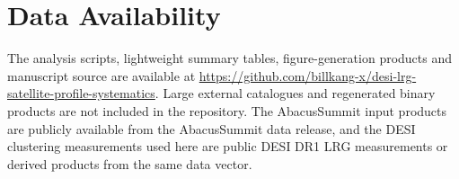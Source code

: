 \documentclass[fleqn,usenatbib]{mnras}
\begin{document}
\section*{Data Availability}

The analysis scripts, lightweight summary tables, figure-generation products and manuscript source are available at \url{https://github.com/billkang-x/desi-lrg-satellite-profile-systematics}.  Large external catalogues and regenerated binary products are not included in the repository.  The AbacusSummit input products are publicly available from the AbacusSummit data release, and the DESI clustering measurements used here are public DESI DR1 LRG measurements or derived products from the same data vector.




\label{lastpage}
\end{document}
